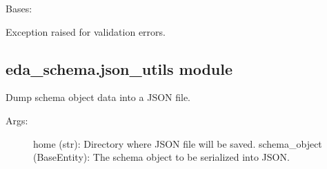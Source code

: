 \documentclass[letterpaper,10pt,english]{sphinxmanual}
\begin{document}
\begin{fulllineitems}
\label{\detokenize{eda_schema:eda_schema.errors.ValidationError}}
\pysigstartsignatures
{}
\pysigstopsignatures
\sphinxAtStartPar
Bases: {\hyperref[\detokenize{eda_schema:eda_schema.errors.EDASchemaError}]{}}

\sphinxAtStartPar
Exception raised for validation errors.

\end{fulllineitems}



\subsection{eda\_schema.json\_utils module}
\label{\detokenize{eda_schema:module-eda_schema.json_utils}}\label{\detokenize{eda_schema:eda-schema-json-utils-module}}

\begin{fulllineitems}
\label{\detokenize{eda_schema:eda_schema.json_utils.dump_json}}
\pysigstartsignatures
{}
\pysigstopsignatures
\sphinxAtStartPar
Dump schema object data into a JSON file.
\begin{description}
\item[{Args:}] \leavevmode
\sphinxAtStartPar
home (str): Directory where JSON file will be saved.
schema\_object (BaseEntity): The schema object to be serialized into JSON.

\end{description}

\end{fulllineitems}
\end{document}
